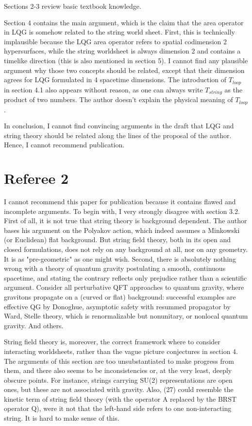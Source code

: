 \documentclass[11pt]{article}
\begin{document}
Sections 2-3 review basic textbook knowledge. 

Section 4 contains the main argument, which is the claim that the area operator in LQG is somehow related to the string world sheet. First, this is technically implausible because the LQG area operator refers to spatial codimension 2 hypersurfaces, while the string worldsheet is always dimension 2 and contains a timelike direction (this is also mentioned in section 5). I cannot find any plausible argument why those two concepts should be related, except that their dimension agrees for LQG formulated in 4 spacetime dimensions. The introduction of $ T_{loop} $ in section 4.1 also appears without reason, as one can always write $ T_{string} $ as the product of two numbers. The author doesn't explain the physical meaning of $ T_{loop} $. 

In conclusion, I cannot find convincing arguments in the draft that LQG and string theory should be related along the lines of the proposal of the author. Hence, I cannot recommend publication. 

\section*{Referee 2}

I cannot recommend this paper for publication because it contains flawed and incomplete arguments. To begin with, I very strongly disagree with section 3.2. First of all, it is not true that string theory is background dependent. The author bases his argument on the Polyakov action, which indeed assumes a Minkowski (or Euclidean) flat background. But string field theory, both in its open and closed formulations, does not rely on any background at all, nor on any geometry. It is as "pre-geometric" as one might wish. Second, there is absolutely nothing wrong with a theory of quantum gravity postulating a smooth, continuous spacetime, and stating the contrary reflects only prejudice rather than a scientific argument. Consider all perturbative QFT approaches to quantum gravity, where gravitons propagate on a (curved or flat) background: successful examples are effective QG by Donoghue, asymptotic safety with resummed propagator by Ward, Stelle theory, which is
renormalizable but nonunitary, or nonlocal quantum gravity. And others.

String field theory is, moreover, the correct framework where to consider interacting worldsheets, rather than the vague picture conjectures in section 4. The arguments of this section are too unsubstantiated to make progress from them, and there also seems to be inconsistencies or, at the very least, deeply obscure points. For instance, strings carrying SU(2) representations are open ones, but these are not associated with gravity. Also, (27) could resemble the kinetic term of string field theory (with the operator A replaced by the BRST operator Q), were it not that the left-hand side refers to one non-interacting string. It is hard to make sense of this.
\end{document}
